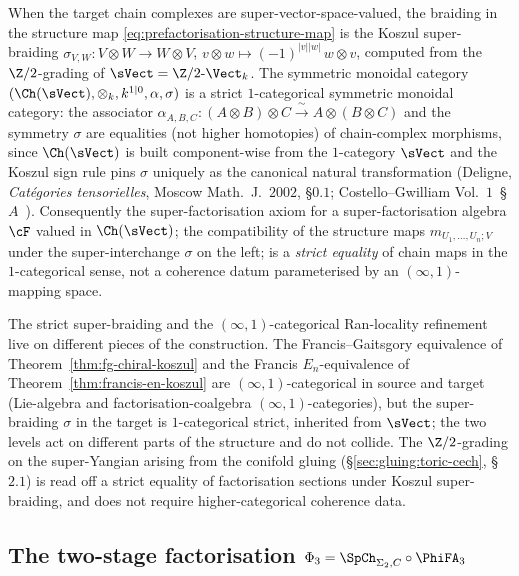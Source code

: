 \begin{remark}
\label{rem:strict-super-factorisation}
When the target chain complexes are super-vector-space-valued, the
braiding in the structure map
\eqref{eq:prefactorisation-structure-map} is the Koszul super-braiding
$\sigma_{V, W} \colon V \otimes W \to W \otimes V$,
$v \otimes w \mapsto (-1)^{|v||w|}\, w \otimes v$, computed from the
$\Z/2$-grading of $\sVect = \Z/2\text{-}\Vect_k$. The symmetric
monoidal category $(\Ch(\sVect), \otimes_k, k^{1|0}, \alpha, \sigma)$
is a strict $1$-categorical symmetric monoidal category: the
associator $\alpha_{A, B, C} \colon (A \otimes B) \otimes C
\xrightarrow{\;\sim\;} A \otimes (B \otimes C)$ and the symmetry
$\sigma$ are equalities (not higher homotopies) of chain-complex
morphisms, since $\Ch(\sVect)$ is built component-wise from the
$1$-category $\sVect$ and the Koszul sign rule pins $\sigma$ uniquely
as the canonical natural transformation (Deligne, \emph{Cat\'egories
tensorielles}, Moscow Math.~J.~$2002$, \S$0.1$; Costello--Gwilliam
Vol.~$1$~\S$A$~\cite{CostelloGwilliam}). Consequently the
super-factorisation axiom for a super-factorisation algebra $\cF$
valued in $\Ch(\sVect)$; the compatibility of the structure maps
$m_{U_1, \ldots, U_n; V}$ under the super-interchange $\sigma$ on the
left; is a \emph{strict equality} of chain maps in the
$1$-categorical sense, not a coherence datum parameterised by an
$(\infty, 1)$-mapping space.

The strict super-braiding and the $(\infty, 1)$-categorical
Ran-locality refinement live on different pieces of the construction.
The Francis--Gaitsgory
equivalence of Theorem~\ref{thm:fg-chiral-koszul} and the Francis
$E_n$-equivalence of Theorem~\ref{thm:francis-en-koszul} are
$(\infty, 1)$-categorical in source and target (Lie-algebra and
factorisation-coalgebra $(\infty, 1)$-categories), but the
super-braiding $\sigma$ in the target is $1$-categorical strict,
inherited from $\sVect$; the two levels act on different parts of the
structure and do not collide. The $\Z/2$-grading on the super-Yangian
arising from the conifold gluing (\S\ref{sec:gluing:toric-cech},
\S$2.1$) is read off a strict equality of factorisation sections under
Koszul super-braiding, and does not require higher-categorical
coherence data.
\end{remark}

\subsection{The two-stage factorisation \texorpdfstring{$\Phi_3 = \SpCh_{\Sigma_2, C} \circ \PhiFA_3$}{Phi3 = SpCh o PhiFA3}}
\label{sec:fa-two-stage}

